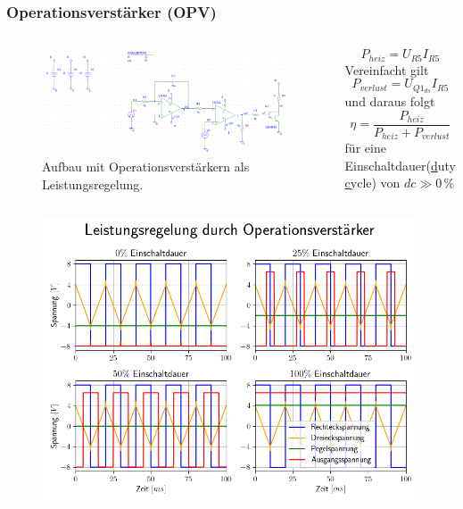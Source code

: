 \documentclass{beamer}
\begin{document}
	\begin{frame}
		\frametitle{Operationsverstärker (OPV)}
		\begin{columns}
			\begin{figure}[tbh]
				\centering
				\includegraphics[width=1\linewidth , trim={10cm 0 0 0}]{medien/V2-0.png}
				\caption[Zweiter Aufbau]{Aufbau mit Operationsverstärkern als Leistungsregelung.}
			\end{figure}
			\begin{equation*}
				P_{heiz}=U_{R5}I_{R5}
			\end{equation*}
			Vereinfacht gilt
			\begin{equation*}
				P_{verlust}=U_{Q1_{ds}}I_{R5}
			\end{equation*}
			und daraus folgt
			\begin{equation*}
				\eta=\frac{P_{heiz}}{P_{heiz}+P_{verlust}}
			\end{equation*}
			für eine Einschaltdauer(\underline{d}uty \underline{c}ycle) von $dc \gg 0\,\%$
		\end{columns}
	\end{frame}
	\begin{frame}
		\begin{center}
			\begin{figure}[tbh]
				\centering
				\includegraphics[width=0.95\linewidth]{medien/2.png}
			\end{figure}
		\end{center}
	\end{frame}
\end{document}
